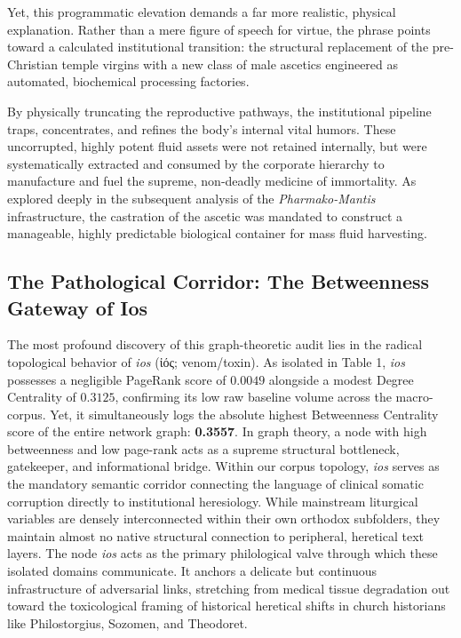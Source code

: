 \documentclass[11pt,twoside,a4paper]{article}
\begin{document}
Yet, this programmatic elevation demands a far more realistic, physical explanation. Rather than a mere figure of speech for virtue, the phrase points toward a calculated institutional transition: the structural replacement of the pre-Christian temple virgins with a new class of male ascetics engineered as automated, biochemical processing factories. 

By physically truncating the reproductive pathways, the institutional pipeline traps, concentrates, and refines the body's internal vital humors. These uncorrupted, highly potent fluid assets were not retained internally, but were systematically extracted and consumed by the corporate hierarchy to manufacture and fuel the supreme, non-deadly medicine of immortality. As explored deeply in the subsequent analysis of the \textit{Pharmako-Mantis} infrastructure, the castration of the ascetic was mandated to construct a manageable, highly predictable biological container for mass fluid harvesting.

\subsection{The Pathological Corridor: The Betweenness Gateway of Ios}
The most profound discovery of this graph-theoretic audit lies in the radical topological behavior of \textit{ios} (\textgreek{ἰός}; venom/toxin). As isolated in Table 1, \textit{ios} possesses a negligible PageRank score of $0.0049$ alongside a modest Degree Centrality of $0.3125$, confirming its low raw baseline volume across the macro-corpus. Yet, it simultaneously logs the absolute highest Betweenness Centrality score of the entire network graph:  \textbf{0.3557}.
In graph theory, a node with high betweenness and low page-rank acts as a supreme structural bottleneck, gatekeeper, and informational bridge. Within our corpus topology, \textit{ios} serves as the mandatory semantic corridor connecting the language of clinical somatic corruption directly to institutional heresiology. While mainstream liturgical variables are densely interconnected within their own orthodox subfolders, they maintain almost no native structural connection to peripheral, heretical text layers. The node \textit{ios} acts as the primary philological valve through which these isolated domains communicate. It anchors a delicate but continuous infrastructure of adversarial links, stretching from medical tissue degradation out toward the toxicological framing of historical heretical shifts in church historians like Philostorgius, Sozomen, and Theodoret.
\end{document}
